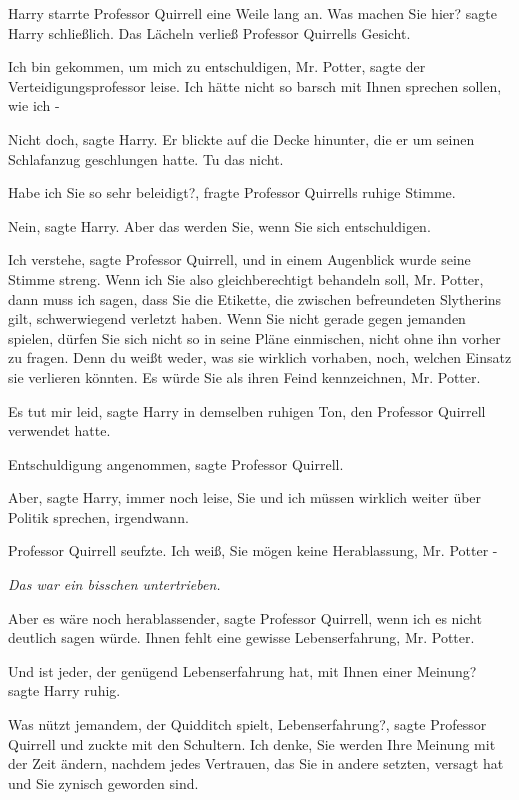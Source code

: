 Harry starrte Professor Quirrell eine Weile lang an. \glqq{}Was machen Sie
hier?\grqq{} sagte Harry schließlich. Das Lächeln verließ Professor Quirrells
Gesicht.

\glqq{}Ich bin gekommen, um mich zu entschuldigen, Mr. Potter\grqq{}, sagte der
Verteidigungsprofessor leise. \glqq{}Ich hätte nicht so barsch mit Ihnen
sprechen sollen, wie ich -\grqq{}

\glqq{}Nicht doch\grqq{}, sagte Harry. Er blickte auf die Decke hinunter, die er
um seinen Schlafanzug geschlungen hatte. \glqq{}Tu das nicht.\grqq{}

\glqq{}Habe ich Sie so sehr beleidigt?\grqq{}, fragte Professor Quirrells ruhige
Stimme.

\glqq{}Nein\grqq{}, sagte Harry. \glqq{}Aber das werden Sie, wenn Sie sich
entschuldigen.\grqq{}

\glqq{}Ich verstehe\grqq{}, sagte Professor Quirrell, und in einem Augenblick
wurde seine Stimme streng. \glqq{}Wenn ich Sie also gleichberechtigt behandeln
soll, Mr. Potter, dann muss ich sagen, dass Sie die Etikette, die zwischen
befreundeten Slytherins gilt, schwerwiegend verletzt haben. Wenn Sie nicht
gerade gegen jemanden spielen, dürfen Sie sich nicht so in seine Pläne
einmischen, nicht ohne ihn vorher zu fragen. Denn du weißt weder, was sie
wirklich vorhaben, noch, welchen Einsatz sie verlieren könnten. Es würde Sie als
ihren Feind kennzeichnen, Mr. Potter.\grqq{}

\glqq{}Es tut mir leid\grqq{}, sagte Harry in demselben ruhigen Ton, den
Professor Quirrell verwendet hatte.

\glqq{}Entschuldigung angenommen\grqq{}, sagte Professor Quirrell.

\glqq{}Aber\grqq{}, sagte Harry, immer noch leise, \glqq{}Sie und ich müssen
wirklich weiter über Politik sprechen, irgendwann.\grqq{}

Professor Quirrell seufzte. \glqq{}Ich weiß, Sie mögen keine Herablassung, Mr.
Potter -\grqq{}

\emph{Das war ein bisschen untertrieben.}

\glqq{}Aber es wäre noch herablassender\grqq{}, sagte Professor Quirrell, \glqq{}
wenn ich es nicht deutlich sagen würde. Ihnen fehlt eine gewisse
Lebenserfahrung, Mr. Potter.\grqq{}

\glqq{}Und ist jeder, der genügend Lebenserfahrung hat, mit Ihnen einer Meinung?
sagte Harry ruhig.

\glqq{}Was nützt jemandem, der Quidditch spielt, Lebenserfahrung?\grqq{}, sagte
Professor Quirrell und zuckte mit den Schultern. \glqq{}Ich denke, Sie werden
Ihre Meinung mit der Zeit ändern, nachdem jedes Vertrauen, das Sie in andere
setzten, versagt hat und Sie zynisch geworden sind.\grqq{}

